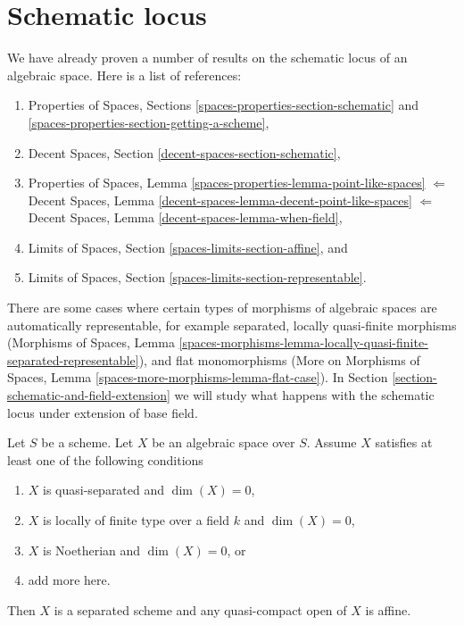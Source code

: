\section{Schematic locus}
\label{section-schematic}

\noindent
We have already proven a number of results on the schematic locus
of an algebraic space. Here is a list of references:
\begin{enumerate}
\item Properties of Spaces, Sections
\ref{spaces-properties-section-schematic} and
\ref{spaces-properties-section-getting-a-scheme},
\item Decent Spaces, Section \ref{decent-spaces-section-schematic},
\item Properties of Spaces, Lemma
\ref{spaces-properties-lemma-point-like-spaces}
$\Leftarrow$
Decent Spaces, Lemma \ref{decent-spaces-lemma-decent-point-like-spaces}
$\Leftarrow$
Decent Spaces, Lemma \ref{decent-spaces-lemma-when-field},
\item Limits of Spaces, Section \ref{spaces-limits-section-affine}, and
\item Limits of Spaces, Section \ref{spaces-limits-section-representable}.
\end{enumerate}
There are some cases where certain types of morphisms of algebraic spaces
are automatically representable, for example
separated, locally quasi-finite morphisms (Morphisms of Spaces, Lemma
\ref{spaces-morphisms-lemma-locally-quasi-finite-separated-representable}),
and flat monomorphisms (More on Morphisms of Spaces, Lemma
\ref{spaces-more-morphisms-lemma-flat-case}).
In Section \ref{section-schematic-and-field-extension}
we will study what happens with the schematic
locus under extension of base field.

\begin{lemma}
\label{lemma-locally-finite-type-dim-zero}
Let $S$ be a scheme. Let $X$ be an algebraic space over $S$.
Assume $X$ satisfies at least one of the following conditions
\begin{enumerate}
\item $X$ is quasi-separated and $\dim(X) = 0$,
\item $X$ is locally of finite type over a field $k$ and $\dim(X) = 0$,
\item $X$ is Noetherian and $\dim(X) = 0$, or
\item add more here.
\end{enumerate}
Then $X$ is a separated scheme and any quasi-compact open of $X$ is affine.
\end{lemma}


